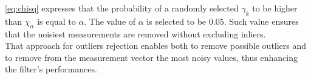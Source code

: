 \cref{eq:chisq} expresses that the probability of a randomly selected $\gamma_k$ to be higher than $\chi_\alpha$ is equal to $\alpha$. The value of $\alpha$ is selected to be 0.05. Such value ensures that the noisiest measurements are removed without excluding inliers.\\
That approach for outliers rejection enables both to remove possible outliers and to remove from the measurement vector the most noisy values, thus enhancing the filter's performances.